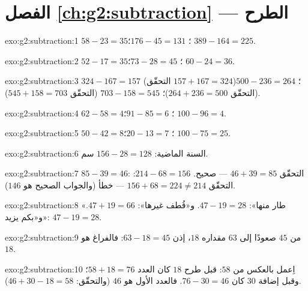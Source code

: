 \section*{الفصل \ref{ch:g2:subtraction} --- الطرح}

\begin{solution}{exo:g2:subtraction:1}
$58 - 23 = 35$؛ \quad $176 - 45 = 131$؛ \quad $389 - 164 = 225$.
\end{solution}

\begin{solution}{exo:g2:subtraction:2}
$52 - 17 = 35$؛ \quad $73 - 28 = 45$؛ \quad $60 - 24 = 36$.
\end{solution}

\begin{solution}{exo:g2:subtraction:3}
$324 - 167 = 157$ (التحقّق $157 + 167 = 324$)؛ \quad
$500 - 236 = 264$ (التحقّق $264 + 236 = 500$)؛ \quad
$703 - 158 = 545$ (التحقّق $545 + 158 = 703$).
\end{solution}

\begin{solution}{exo:g2:subtraction:4}
$62 - 58 = 4$؛ \quad $91 - 85 = 6$؛ \quad $100 - 96 = 4$.
\end{solution}

\begin{solution}{exo:g2:subtraction:5}
$50 - 42 = 8$؛ \quad $20 - 13 = 7$؛ \quad $100 - 75 = 25$.
\end{solution}

\begin{solution}{exo:g2:subtraction:6}
السنة الماضية: $156 - 28 = 128$ سم.
\end{solution}

\begin{solution}{exo:g2:subtraction:7}
$85 - 39 = 46$: التحقّق $46 + 39 = 85$ --- صحيح.
$214 - 68 = 156$: التحقّق $156 + 68 = 224 \neq 214$ --- خطأ (والجواب
الصحيح هو $146$).
\end{solution}

\begin{solution}{exo:g2:subtraction:8}
«طار منها»: $47 - 19 = 28$. و«قُطف غيرها»: $47 + 19 = 66$.
و«بكم يزيد»: $47 - 19 = 28$.
\end{solution}

\begin{solution}{exo:g2:subtraction:9}
من $45$ صعودًا إلى $63$ مقداره $18$، إذن $63 - 18 = 45$: فالفراغ هو $18$.
\end{solution}

\begin{solution}{exo:g2:subtraction:10}
اِعمل بالعكس من $58$: قبل طرح $18$ كان العدد
$58 + 18 = 76$؛ وقبل إضافة $30$ كان $76 - 30 = 46$. فالعدد
الأول هو $46$ (والتحقّق: $46 + 30 - 18 = 58$).
\end{solution}
